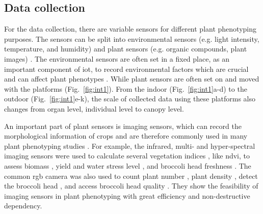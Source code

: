 \subsection{Data collection}
For the data collection, there are variable sensors for different plant phenotyping purposes. The sensors can be split into environmental sensors (e.g. light intensity, temperature, and humidity) and plant sensors (e.g. organic compounds, plant images) \citep{garlando_plants_2020}. The environmental sensors are often set in a fixed place, as an important component of \gls{iot}, to record environmental factors which are crucial and can affect plant phenotypes \citep{ghanem_physiological_2015}. While plant sensors are often set on and moved with the platforms (Fig.~\ref{fig:int1}). From the indoor (Fig.~\ref{fig:int1}a-d) to the outdoor (Fig.~\ref{fig:int1}e-k), the scale of collected data using these platforms also changes from organ level, individual level to canopy level.




An important part of plant sensors is imaging sensors, which can record the morphological information of crops and are therefore commonly used in many plant phenotyping studies \citep{paulus_measuring_2019, feng_comprehensive_2021}. For example, the infrared, multi- and hyper-spectral imaging sensors were used to calculate several vegetation indices \citep{han_modeling_2019}, like \gls{ndvi}, to assess biomass \citep{jimenez-berni_high_2018}, yield and water stress level \citep{herrero_yield_2020, romano_use_2011}, and broccoli head freshness \citep{guo_evaluation_2022}. The common \gls{rgb} camera was also used to count plant number \citep{liu_estimating_2022}, plant density \citep{velumani_estimates_2021}, detect the broccoli head \citep{blok_machine_2016}, and access broccoli head quality \citep{stansell_use_2017}. They show the feasibility of imaging sensors in plant phenotyping with great efficiency and non-destructive dependency.

